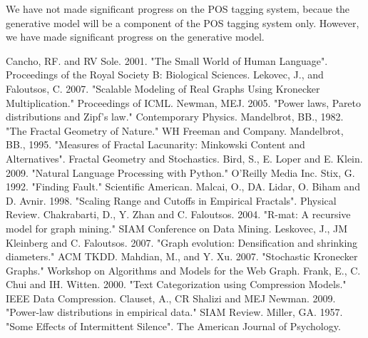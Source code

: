 \documentclass[12pt]{article}
\begin{document}

We have not made significant progress on the POS tagging system, becaue the generative model will be a component of the POS tagging system only. However, we have made significant progress on the generative model.



\begin{thebibliography}{99}
    Cancho, RF. and RV Sole. 2001. "The Small World of Human Language". Proceedings of the Royal Society B: Biological Sciences.
    Lekovec, J., and Faloutsos, C. 2007. "Scalable Modeling of Real Graphs Using Kronecker Multiplication." Proceedings of ICML.
    Newman, MEJ. 2005. "Power laws, Pareto distributions and Zipf's law." Contemporary Physics.
    Mandelbrot, BB., 1982. "The Fractal Geometry of Nature." WH Freeman and Company.
    Mandelbrot, BB., 1995. "Measures of Fractal Lacunarity: Minkowski Content and Alternatives". Fractal Geometry and Stochastics.
    Bird, S., E. Loper and E. Klein. 2009. "Natural Language Processing with Python." O'Reilly Media Inc.
    Stix, G. 1992. "Finding Fault." Scientific American.
    Malcai, O., DA. Lidar, O. Biham and D. Avnir. 1998. "Scaling Range and Cutoffs in Empirical Fractals". Physical Review.
    Chakrabarti, D., Y. Zhan and C. Faloutsos. 2004. "R-mat: A recursive model for graph mining." SIAM Conference on Data Mining.
    Leskovec, J., JM Kleinberg and C. Faloutsos. 2007. "Graph evolution: Densification and shrinking diameters." ACM TKDD.
    Mahdian, M., and Y. Xu. 2007. "Stochastic Kronecker Graphs." Workshop on Algorithms and Models for the Web Graph.
    Frank, E., C. Chui and IH. Witten. 2000. "Text Categorization using Compression Models." IEEE Data Compression.
    Clauset, A., CR Shalizi and MEJ Newman. 2009. "Power-law distributions in empirical data." SIAM Review.
    Miller, GA. 1957. "Some Effects of Intermittent Silence". The American Journal of Psychology.
\end{thebibliography}
\end{document}
